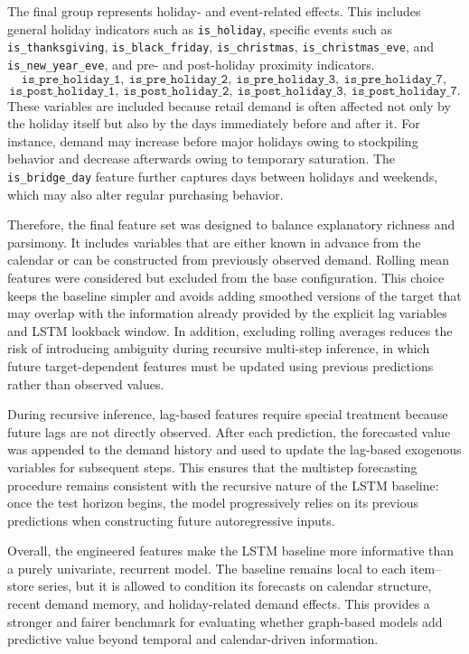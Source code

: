 The final group represents holiday- and event-related effects. This includes general holiday indicators such as \texttt{is\_holiday}, specific events such as \texttt{is\_thanksgiving}, \texttt{is\_black\_friday}, \texttt{is\_christmas}, \texttt{is\_christmas\_eve}, and \texttt{is\_new\_year\_eve}, and pre- and post-holiday proximity indicators.
\[
\texttt{is\_pre\_holiday\_1},\ 
\texttt{is\_pre\_holiday\_2},\ 
\texttt{is\_pre\_holiday\_3},\ 
\texttt{is\_pre\_holiday\_7},
\]
\[
\texttt{is\_post\_holiday\_1},\ 
\texttt{is\_post\_holiday\_2},\ 
\texttt{is\_post\_holiday\_3},\ 
\texttt{is\_post\_holiday\_7}.
\]
These variables are included because retail demand is often affected not only by the holiday itself but also by the days immediately before and after it. For instance, demand may increase before major holidays owing to stockpiling behavior and decrease afterwards owing to temporary saturation. The \texttt{is\_bridge\_day} feature further captures days between holidays and weekends, which may also alter regular purchasing behavior.

Therefore, the final feature set was designed to balance explanatory richness and parsimony. It includes variables that are either known in advance from the calendar or can be constructed from previously observed demand. Rolling mean features were considered but excluded from the base configuration. This choice keeps the baseline simpler and avoids adding smoothed versions of the target that may overlap with the information already provided by the explicit lag variables and LSTM lookback window. In addition, excluding rolling averages reduces the risk of introducing ambiguity during recursive multi-step inference, in which future target-dependent features must be updated using previous predictions rather than observed values.

During recursive inference, lag-based features require special treatment because future lags are not directly observed. After each prediction, the forecasted value was appended to the demand history and used to update the lag-based exogenous variables for subsequent steps. This ensures that the multistep forecasting procedure remains consistent with the recursive nature of the LSTM baseline: once the test horizon begins, the model progressively relies on its previous predictions when constructing future autoregressive inputs.

Overall, the engineered features make the LSTM baseline more informative than a purely univariate, recurrent model. The baseline remains local to each item--store series, but it is allowed to condition its forecasts on calendar structure, recent demand memory, and holiday-related demand effects. This provides a stronger and fairer benchmark for evaluating whether graph-based models add predictive value beyond temporal and calendar-driven information.


